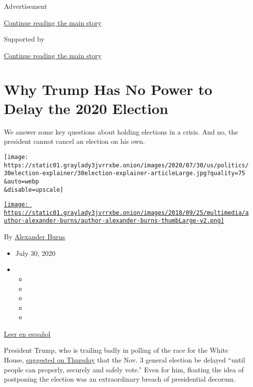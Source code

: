 Advertisement

\protect\hyperlink{after-top}{Continue reading the main story}

Supported by

\protect\hyperlink{after-sponsor}{Continue reading the main story}

\hypertarget{why-trump-has-no-power-to-delay-the-2020-election}{%
\section{Why Trump Has No Power to Delay the 2020
Election}\label{why-trump-has-no-power-to-delay-the-2020-election}}

We answer some key questions about holding elections in a crisis. And
no, the president cannot cancel an election on his own.

\texttt{[image: https://static01.graylady3jvrrxbe.onion/images/2020/07/30/us/politics/30election-explainer/30election-explainer-articleLarge.jpg?quality=75\\\&auto=webp\\\&disable=upscale]}

\href{https://www.nytimes3xbfgragh.onion/by/alexander-burns}{\texttt{[image: https://static01.graylady3jvrrxbe.onion/images/2018/09/25/multimedia/author-alexander-burns/author-alexander-burns-thumbLarge-v2.png]}}

By
\href{https://www.nytimes3xbfgragh.onion/by/alexander-burns}{Alexander
Burns}

\begin{itemize}
\item
  July 30, 2020
\item
  \begin{itemize}
  \item
  \item
  \item
  \item
  \item
  \end{itemize}
\end{itemize}

\href{https://www.nytimes3xbfgragh.onion/es/2020/07/30/espanol/estados-unidos/trump-retrasar-elecciones.html}{Leer
en español}

President Trump, who is trailing badly in polling of the race for the
White House,
\href{https://www.nytimes3xbfgragh.onion/2020/07/30/us/elections/biden-vs-trump.html}{suggested
on Thursday} that the Nov. 3 general election be delayed ``until people
can properly, securely and safely vote.'' Even for him, floating the
idea of postponing the election was an extraordinary breach of
presidential decorum.

